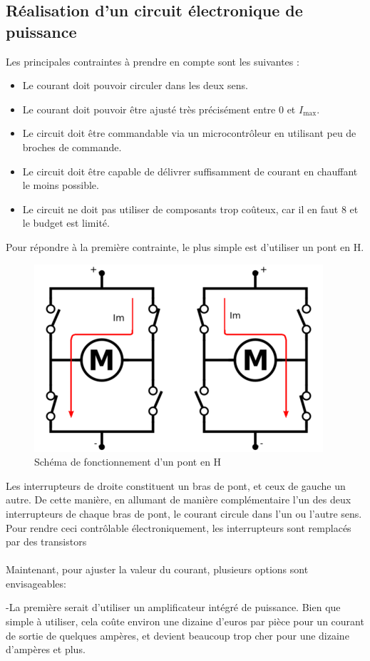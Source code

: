 \documentclass{article}
\begin{document}
\subsection{Réalisation d'un circuit électronique de puissance}
Les principales contraintes à prendre en compte sont les suivantes :
\begin{itemize}
    \item Le courant doit pouvoir circuler dans les deux sens.
    \item     Le courant doit pouvoir être ajusté très précisément entre 0 et $I_{\text{max}}$.
    \item Le circuit doit être commandable via un microcontrôleur en utilisant peu de broches de commande.
    \item Le circuit doit être capable de délivrer suffisamment de courant en chauffant le moins possible.
    \item Le circuit ne doit pas utiliser de composants trop coûteux, car il en faut 8 et le budget est limité.

\end{itemize}

Pour répondre à la première contrainte, le plus simple est d'utiliser un pont en H.
    \begin{figure}[H]
    \centering
    \includegraphics[width=0.25\linewidth]{Images/pontH.png}
    \caption{Schéma de fonctionnement d'un pont en H }
    \label{fig:pontH}
\end{figure}
\noindent
Les interrupteurs de droite constituent un bras de pont, et ceux de gauche un autre. De cette manière, en allumant de manière complémentaire l'un des deux interrupteurs de chaque bras de pont, le courant circule dans l'un ou l'autre sens. Pour rendre ceci contrôlable électroniquement, les interrupteurs sont remplacés par des transistors
\\
\\
Maintenant, pour ajuster la valeur du courant, plusieurs options sont envisageables:

-La première serait d'utiliser un amplificateur intégré de puissance. Bien que simple à utiliser, cela coûte environ une dizaine d'euros par pièce pour un courant de sortie de quelques ampères, et devient beaucoup trop cher pour une dizaine d'ampères et plus.
\end{document}
